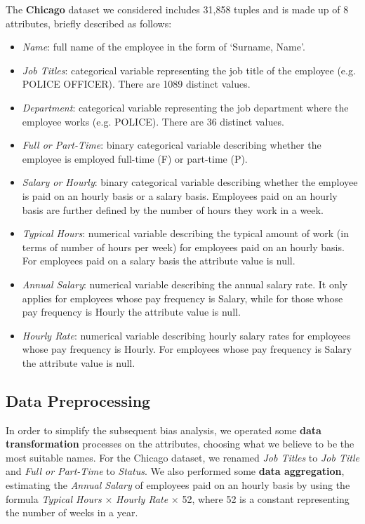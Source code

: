 The \textbf{Chicago} dataset we considered includes 31,858 tuples and is made up of 8 attributes, briefly described as follows:
\begin{itemize}
\item \textit{Name}: full name of the employee in the form of `Surname, Name'.
\item \textit{Job Titles}: categorical variable representing the job title of the employee (e.g. POLICE OFFICER). There are 1089 distinct values.
\item \textit{Department}: categorical variable representing the job department where the employee works (e.g. POLICE). There are 36 distinct values.
\item \textit{Full or Part-Time}: binary categorical variable describing whether the employee is employed full-time (F) or part-time (P).
\item \textit{Salary or Hourly}: binary categorical variable describing whether the employee is paid on an hourly basis or a salary basis. Employees paid on an hourly basis are further defined by the number of hours they work in a week.
\item \textit{Typical Hours}: numerical variable describing the typical amount of work (in terms of number of hours per week) for employees paid on an hourly basis. For employees paid on a salary basis the attribute value is null.
\item \textit{Annual Salary}: numerical variable describing the annual salary rate. It only applies for employees whose pay frequency is Salary, while for those whose pay frequency is Hourly the attribute value is null.
\item \textit{Hourly Rate}: numerical variable describing hourly salary rates for employees whose pay frequency is Hourly. For employees whose pay frequency is Salary the attribute value is null.
\end{itemize}


\subsection{Data Preprocessing}
\label{section:chicago_data_preprocessing}
In order to simplify the subsequent bias analysis, we operated some \textbf{data transformation} processes on the attributes, choosing what we believe to be the most suitable names. For the Chicago dataset, we renamed \textit{Job Titles} to \textit{Job Title} and \textit{Full or Part-Time} to \textit{Status}. We also performed some \textbf{data aggregation}, estimating the \textit{Annual Salary} of employees paid on an hourly basis by using the formula \textit{Typical Hours} \(\times\) \textit{Hourly Rate} \(\times\) 52, where 52 is a constant representing the number of weeks in a year.

